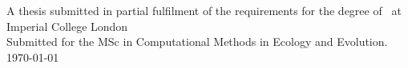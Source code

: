 \begin{titlepage}
    
    \vfill %
    A thesis submitted in partial fulfilment of the requirements for the degree of \degreetype \ at Imperial College London \\ Submitted for the MSc in Computational Methods in Ecology and Evolution.\\[0.5cm]
    
    \makeatletter
    \today
    \makeatother


\end{titlepage}